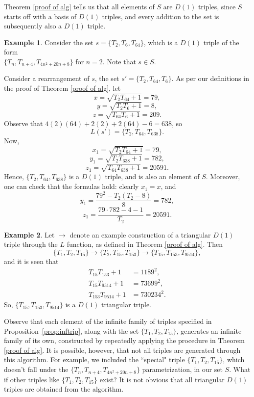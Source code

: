 \documentclass[12pt]{amsart}
\theoremstyle{theorem}
\theoremstyle{definition}
\newtheorem{example}{Example}
\theoremstyle{plain}
\begin{document}
 Theorem \ref{proof of alg} tells us that all elements of $S$ are $D(1)$ triples, since $S$ starts off with a basis of $D(1)$ triples, and every addition to the set is subsequently also a $D(1)$ triple. 

 \begin{example}
    Consider the set $s = \{T_2, T_6, T_{64} \}$, which is a $D(1)$ triple of the form \\ $\{T_n, T_{n+4}, T_{4n^2 + 20n + 8} \}$ for $n=2$. Note that $s \in S$.
    
    Consider a rearrangement of $s$, the set $s' = \{T_2, T_{64}, T_6 \}$. As per our definitions in the proof of Theorem \ref{proof of alg}, let $$x = \sqrt{T_2 T_{64} + 1} = 79,$$ $$y = \sqrt{T_2 T_6 + 1} = 8,$$ $$z = \sqrt{T_{64} T_6 + 1} = 209.$$ Observe that $4(2)(64) + 2(2) + 2(64) - 6 = 638$, so $$L(s') = \{T_2, T_{64}, T_{638} \}.$$ Now, $$x_1 = \sqrt{T_2 T_{64} + 1} = 79,$$ $$y_1 = \sqrt{T_2 T_{638} + 1} = 782,$$ $$z_1 = \sqrt{T_{64} T_{638} + 1} = 20591.$$ Hence, $\{T_2, T_{64}, T_{638} \}$ is a $D(1)$ triple, and is also an element of $S$. Moreover, one can check that the formulas hold: clearly $x_1 = x$, and $$y_1 = \frac{79^2 - T_2(T_2 - 8)}{8} = 782,$$ $$z_1 = \frac{79 \cdot 782 - 4 - 1}{T_2} = 20591.$$
\end{example}
 
\begin{example}\label{eg:genalg}
    Let $\to$ denote an example construction of a triangular $D(1)$ triple through the $L$ function, as defined in Theorem \ref{proof of alg}. Then \[\{T_1,T_2,T_{15}\}\to\{T_2,T_{15},T_{153}\}\to\{T_{15},T_{153},T_{9514}\},\] and it is seen that \begin{align*}T_{15}T_{153}+1&=1189^2,\\T_{15}T_{9514}+1&=73699^2,\\T_{153}T_{9514}+1&=730234^2.\end{align*} So, $\{T_{15}, T_{153}, T_{9514} \}$ is a $D(1)$ triangular triple.
\end{example}

Observe that each element of the infinite family of triples specified in Proposition~\ref{prop:inftrip}, along with the set $\{T_1, T_2, T_{15} \}$, generates an infinite family of its own, constructed by repeatedly applying the procedure in Theorem \ref{proof of alg}. It is possible, however, that not all triples are generated through this algorithm. For example, we included the ``special" triple $\{T_1,T_2,T_{15}\}$, which doesn't fall under the $\{T_n, T_{n+4}, T_{4n^2+20n+8} \}$ parametrization, in our set $S$. What if other triples like $\{T_1, T_2, T_{15} \}$ exist? It is not obvious that all triangular $D(1)$ triples are obtained from the algorithm.
\\
\end{document}
